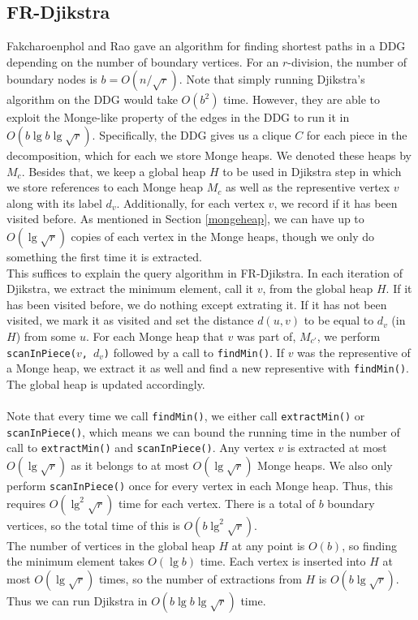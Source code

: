 \subsection{FR-Djikstra}\label{frdjikstra}
Fakcharoenphol and Rao \cite{fakcharoenphol2006planar} gave an algorithm for finding
shortest paths in a DDG depending on the number of boundary vertices. For an
$r$-division, the number of boundary nodes is $b=O(n/\sqrt{r})$. Note that simply
running Djikstra's algorithm on the DDG would take
$O(b^2)$ time. However, they are able to exploit the Monge-like property of the
edges in the DDG to run it in $O(b\lg b\lg \sqrt{r})$. Specifically, the DDG gives us a
clique $C$ for each piece in the decomposition, which for each we store Monge heaps. We
denoted these heaps by $M_c$. Besides that, we keep a global heap $H$ to be used in Djikstra step in which we store references to each Monge heap $M_c$ as well as the
representive vertex $v$ along with its label $d_v$. Additionally, for each vertex $v$, we
record if it has been visited before. As mentioned in
Section \ref{mongeheap}, we can have up to $O(\lg \sqrt{r})$ copies of each vertex in the
Monge heaps, though we only do something the first time it is extracted. \\
This suffices to explain the query algorithm in FR-Djikstra. In each iteration of
Djikstra, we extract the minimum element, call it $v$, from the global heap $H$. If it has been visited
before, we do nothing except extrating it. If it has not been visited, we mark it as
visited and set the distance $d(u,v)$ to be equal to $d_v$ (in $H$) from some $u$. For
each Monge heap that $v$ was part of, $M_{c'}$, we perform \texttt{scanInPiece($v$,
$d_v$)} followed by a call to \texttt{findMin()}. If $v$ was the representive of a Monge
heap, we extract it as well and find a new representive with \texttt{findMin()}. The
global heap is updated accordingly. \\
\\
Note that every time we call \texttt{findMin()}, we either call \texttt{extractMin()} or
\texttt{scanInPiece()}, which means we can bound the running time in the number of call to
\texttt{extractMin()} and \texttt{scanInPiece()}. Any vertex $v$ is extracted at most
$O(\lg \sqrt{r})$ as it belongs to at most $O(\lg \sqrt{r})$ Monge heaps. We also only
perform \texttt{scanInPiece()} once for every vertex in each Monge heap. Thus, this
requires $O(\lg^2 \sqrt{r})$ time for each vertex. There is a total of $b$ boundary
vertices, so the total time of this is $O(b\lg^2 \sqrt{r})$. \\
The number of vertices in the global heap $H$ at any point is $O(b)$, so finding the
minimum element takes $O(\lg b)$ time. Each vertex is inserted into $H$ at most $O(\lg
\sqrt{r})$ times, so the number of extractions from $H$ is $O(b\lg \sqrt{r})$. Thus we
can run Djikstra in $O(b\lg b\lg \sqrt{r})$ time.

